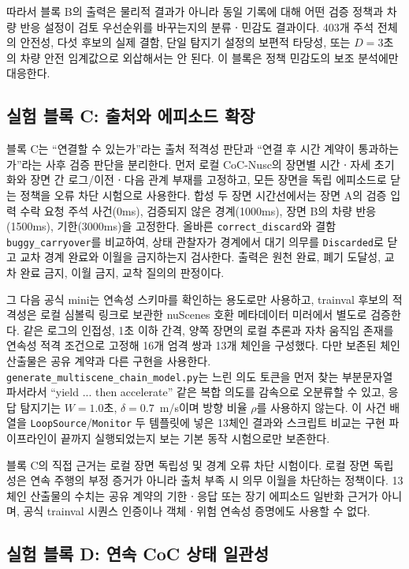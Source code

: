 따라서 블록 B의 출력은 물리적 결과가 아니라 동일 기록에 대해 어떤 검증 정책과 차량 반응 설정이 검토 우선순위를 바꾸는지의 분류ㆍ민감도 결과이다. 403개 주석 전체의 안전성, 다섯 후보의 실제 결함, 단일 탐지기 설정의 보편적 타당성, 또는 $D=3$초의 차량 안전 임계값으로 외삽해서는 안 된다. 이 블록은 정책 민감도의 보조 분석에만 대응한다.

\subsection{실험 블록 C: 출처와 에피소드 확장}
\label{sec:exp-block-c}

블록 C는 ``연결할 수 있는가''라는 출처 적격성 판단과 ``연결 후 시간 계약이 통과하는가''라는 사후 검증 판단을 분리한다. 먼저 로컬 CoC-Nusc의 장면별 시간ㆍ자세 초기화와 장면 간 로그/이전ㆍ다음 관계 부재를 고정하고, 모든 장면을 독립 에피소드로 닫는 정책을 오류 차단 시험으로 사용한다. 합성 두 장면 시간선에서는 장면 A의 검증 입력 수락 요청 주석 사건(0ms), 검증되지 않은 경계(1000ms), 장면 B의 차량 반응(1500ms), 기한(3000ms)을 고정한다. 올바른 \texttt{correct\_discard}와 결함 \texttt{buggy\_carryover}를 비교하여, 상태 관찰자가 경계에서 대기 의무를 \texttt{Discarded}로 닫고 교차 경계 완료와 이월을 금지하는지 검사한다. 출력은 원천 완료, 폐기 도달성, 교차 완료 금지, 이월 금지, 교착 질의의 판정이다.

그 다음 공식 mini는 연속성 스키마를 확인하는 용도로만 사용하고, trainval 후보의 적격성은 로컬 심볼릭 링크로 보관한 nuScenes 호환 메타데이터 미러에서 별도로 검증한다. 같은 로그의 인접성, 1초 이하 간격, 양쪽 장면의 로컬 추론과 자차 움직임 존재를 연속성 적격 조건으로 고정해 16개 엄격 쌍과 13개 체인을 구성했다. 다만 보존된 체인 산출물은 공유 계약과 다른 구현을 사용한다. \texttt{generate\_multiscene\_chain\_model.py}는 느린 의도 토큰을 먼저 찾는 부분문자열 파서라서 ``yield ... then accelerate'' 같은 복합 의도를 감속으로 오분류할 수 있고, 응답 탐지기는 $W=1.0$초, $\delta=0.7$~m/s이며 방향 비율 $\rho$를 사용하지 않는다. 이 사건 배열을 \texttt{LoopSource}/\texttt{Monitor} 두 템플릿에 넣은 13체인 결과와 스크립트 비교는 구현 파이프라인이 끝까지 실행되었는지 보는 기본 동작 시험으로만 보존한다.

블록 C의 직접 근거는 로컬 장면 독립성 및 경계 오류 차단 시험이다. 로컬 장면 독립성은 연속 주행의 부정 증거가 아니라 출처 부족 시 의무 이월을 차단하는 정책이다. 13체인 산출물의 수치는 공유 계약의 기한ㆍ응답 또는 장기 에피소드 일반화 근거가 아니며, 공식 trainval 시퀀스 인증이나 객체ㆍ위험 연속성 증명에도 사용할 수 없다.

\subsection{실험 블록 D: 연속 CoC 상태 일관성}
\label{sec:exp-block-d}

